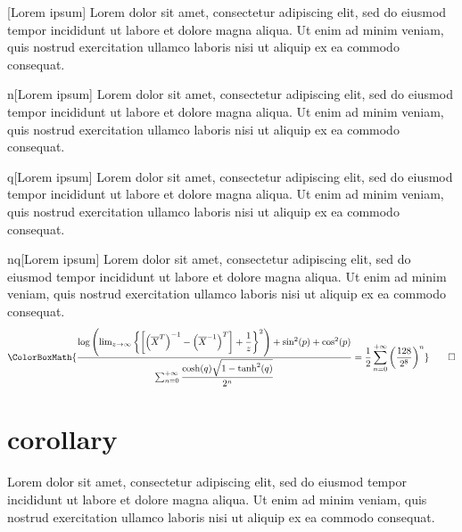\begin{lemma}{}[Lorem ipsum]
	Lorem dolor sit amet, consectetur adipiscing elit, sed do eiusmod tempor incididunt ut labore et dolore magna aliqua. Ut enim ad minim veniam, quis nostrud exercitation ullamco laboris nisi ut aliquip ex ea commodo consequat.
\end{lemma}

\begin{lemma}{n}[Lorem ipsum]
	Lorem dolor sit amet, consectetur adipiscing elit, sed do eiusmod tempor incididunt ut labore et dolore magna aliqua. Ut enim ad minim veniam, quis nostrud exercitation ullamco laboris nisi ut aliquip ex ea commodo consequat.
\end{lemma}

\begin{lemma}{q}[Lorem ipsum]
	Lorem dolor sit amet, consectetur adipiscing elit, sed do eiusmod tempor incididunt ut labore et dolore magna aliqua. Ut enim ad minim veniam, quis nostrud exercitation ullamco laboris nisi ut aliquip ex ea commodo consequat.
\end{lemma}

\begin{lemma}{nq}[Lorem ipsum]
	Lorem dolor sit amet, consectetur adipiscing elit, sed do eiusmod tempor incididunt ut labore et dolore magna aliqua. Ut enim ad minim veniam, quis nostrud exercitation ullamco laboris nisi ut aliquip ex ea commodo consequat.
	\begin{equation*}
		\ColorBoxMath{\dfrac{\log\left(\lim_{z\to\infty}\left\{\left[\left(\overline{X}^{T}\right)^{-1}-\left(\overline{X}^{-1}\right)^T\right]+\dfrac{1}{z}\right\}^2\right)+\sin^2(p)+\cos^2(p)}{\sum_{n=0}^{+\infty}\dfrac{\cosh(q)\sqrt{1-\tanh^2(q)}}{2^n}}=\dfrac{1}{2}\sum_{n=0}^{+\infty}\left(\dfrac{128}{2^8}\right)^n}\qedhere
	\end{equation*}
\end{lemma}

\newpage

\section{corollary}

\begin{corollary}{}
	Lorem dolor sit amet, consectetur adipiscing elit, sed do eiusmod tempor incididunt ut labore et dolore magna aliqua. Ut enim ad minim veniam, quis nostrud exercitation ullamco laboris nisi ut aliquip ex ea commodo consequat.
\end{corollary}

